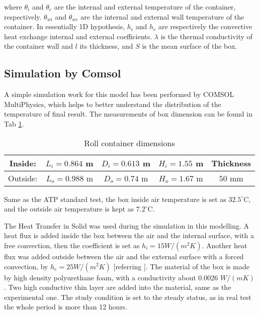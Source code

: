 \noindent where $\theta_i$ and $\theta_e$ are the internal and external temperature of the container, respectively. $\theta_{wi}$ and $\theta_{we}$ are the internal and external wall temperature of the container. In essentially 1D hypothesis, $h_i$ and $h_e$ are respectively the convective heat exchange internal and external coefficients. $\lambda$ is the thermal conductivity of the container wall and $l$ its thickness, and $S$ is the mean surface of the box.


\subsection{Simulation by Comsol}

A simple simulation work for this model has been performed by COMSOL MultiPhysics, which helps to better understand the distribution of the temperature of final result. The measurements of box dimension can be found in Tab \ref{tab_box_dim}.

\begin{table}[h]
	\centering
	\begin{tabular}{c|c|c|c||c}
		\hline
		Inside:  & $L_i=0.864$ m  & $D_i=0.613$ m  & $H_i=1.55$ m & Thickness\\
		\hline
		Outside:  & $L_o=0.988$ m & $D_o=0.74$ m & $H_o=1.67$ m  &  $50$ mm \\
		\hline
	\end{tabular}
	\caption{Roll container dimensions}
	\label{tab_box_dim}
\end{table}

Same as the ATP standard test, the box inside air temperature is set as $32.5^{\circ}$C, and the outside air temperature is kept as $7.2^{\circ}$C. 

The Heat Transfer in Solid was used during the simulation in this modelling. A heat flux is added inside the box between the air and the internal surface, with a free convection, then the coefficient is set as $h_i=15 W/(m^2 K)$. Another heat flux was added outside between the air and the external surface with a forced convection, by $h_e=25 W/(m^2 K)$ [referring \citep{airhe,htwiki}]. The material of the box is made by high density polyurethane foam, with a conductivity about 0.0026 $W/(mK)$ \citep{jarfelt2006thermal}. Two high conductive thin layer are added into the material, same as the experimental one. The study condition is set to the steady status, as in real test the whole period is more than 12 hours.

